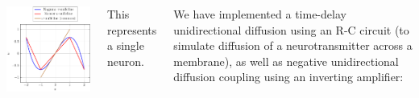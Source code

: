 \documentclass[25pt, a0paper, landscape, fleqn]{tikzposter}
\begin{document}
\begin{columns}
{\begin{minipage}[b]{0.1\pagewidth}
\begin{tikzfigure}[Nullclines]
      \includegraphics[width = 0.1\pagewidth]{./Figures/Nullclines/Nullclines.pdf}
    \end{tikzfigure}
  \end{minipage}

  This represents a single neuron.

  We have implemented a time-delay unidirectional diffusion using an R-C circuit (to simulate diffusion of a neurotransmitter across a membrane), as well as negative unidirectional diffusion coupling using an inverting amplifier:

}
\end{columns}
\end{document}
